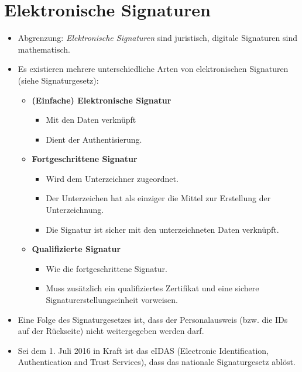 \documentclass[a4paper, 11pt, accentcolor = tud3b]{tudreport}
\begin{document}
        \section{Elektronische Signaturen}
	        \begin{itemize}
	        	\item Abgrenzung: \textit{Elektronische Signaturen} sind juristisch, digitale Signaturen sind mathematisch.
	        	\item Es existieren mehrere unterschiedliche Arten von elektronischen Signaturen (siehe Signaturgesetz):
		        	\begin{itemize}
		        		\item \textbf{(Einfache) Elektronische Signatur}
			        		\begin{itemize}
			        			\item Mit den Daten verknüpft
			        			\item Dient der Authentisierung.
			        		\end{itemize}
		        		\item \textbf{Fortgeschrittene Signatur}
			        		\begin{itemize}
			        			\item Wird dem Unterzeichner zugeordnet.
			        			\item Der Unterzeichen hat als einziger die Mittel zur Erstellung der Unterzeichnung.
			        			\item Die Signatur ist sicher mit den unterzeichneten Daten verknüpft.
			        		\end{itemize}
		        		\item \textbf{Qualifizierte Signatur}
			        		\begin{itemize}
			        			\item Wie die fortgeschrittene Signatur.
			        			\item Muss zusätzlich ein qualifiziertes Zertifikat und eine sichere Signaturerstellungseinheit vorweisen.
			        		\end{itemize}
		        	\end{itemize}
	        	\item Eine Folge des Signaturgesetzes ist, dass der Personalausweis (bzw. die IDs auf der Rückseite) nicht weitergegeben werden darf.
	        	\item Sei dem 1. Juli 2016 in Kraft ist das eIDAS (Electronic Identification, Authentication and Trust Services), dass das nationale Signaturgesetz ablöst.
		        	\begin{itemize}

\end{itemize}
\end{itemize}
\end{document}
